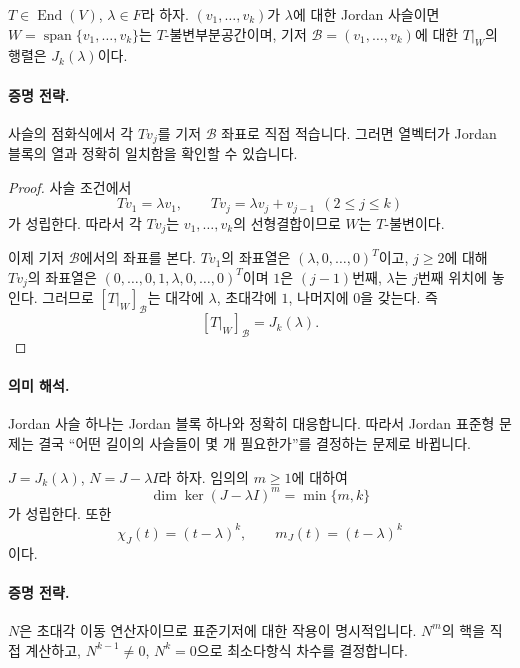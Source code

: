 \begin{theorem}
$T\in\operatorname{End}(V)$, $\lambda\in F$라 하자. $(v_1,\dots,v_k)$가 $\lambda$에 대한 Jordan 사슬이면 $W=\operatorname{span}\{v_1,\dots,v_k\}$는 $T$-불변부분공간이며, 기저 $\mathcal{B}=(v_1,\dots,v_k)$에 대한 $T|_W$의 행렬은 $J_k(\lambda)$이다.
\end{theorem}

\paragraph{증명 전략.}
사슬의 점화식에서 각 $Tv_j$를 기저 $\mathcal{B}$ 좌표로 직접 적습니다. 그러면 열벡터가 Jordan 블록의 열과 정확히 일치함을 확인할 수 있습니다.

\begin{proof}
사슬 조건에서
$$
Tv_1=\lambda v_1,\qquad Tv_j=\lambda v_j+v_{j-1}\ \ (2\le j\le k)
$$
가 성립한다. 따라서 각 $Tv_j$는 $v_1,\dots,v_k$의 선형결합이므로 $W$는 $T$-불변이다.

이제 기저 $\mathcal{B}$에서의 좌표를 본다. $Tv_1$의 좌표열은 $(\lambda,0,\dots,0)^T$이고, $j\ge2$에 대해 $Tv_j$의 좌표열은 $(0,\dots,0,1,\lambda,0,\dots,0)^T$이며 $1$은 $(j-1)$번째, $\lambda$는 $j$번째 위치에 놓인다. 그러므로 $[T|_W]_{\mathcal{B}}$는 대각에 $\lambda$, 초대각에 $1$, 나머지에 $0$을 갖는다. 즉
$$
[T|_W]_{\mathcal{B}}=J_k(\lambda).
$$
\end{proof}

\paragraph{의미 해석.}
Jordan 사슬 하나는 Jordan 블록 하나와 정확히 대응합니다. 따라서 Jordan 표준형 문제는 결국 ``어떤 길이의 사슬들이 몇 개 필요한가''를 결정하는 문제로 바뀝니다.

\begin{theorem}
$J=J_k(\lambda)$, $N=J-\lambda I$라 하자. 임의의 $m\ge 1$에 대하여
$$
\dim\ker (J-\lambda I)^m=\min\{m,k\}
$$
가 성립한다. 또한
$$
\chi_J(t)=(t-\lambda)^k,\qquad m_J(t)=(t-\lambda)^k
$$
이다.
\end{theorem}

\paragraph{증명 전략.}
$N$은 초대각 이동 연산자이므로 표준기저에 대한 작용이 명시적입니다. $N^m$의 핵을 직접 계산하고, $N^{k-1}\neq0$, $N^k=0$으로 최소다항식 차수를 결정합니다.

